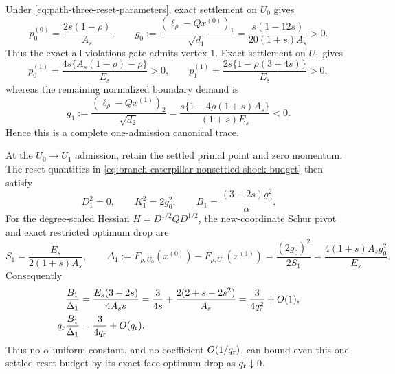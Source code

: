 \begin{proposition}
\label{prop:path-three-settled-reset-drop-obstruction}
Under \cref{eq:path-three-reset-parameters}, exact settlement on $U_0$ gives
\begin{equation}
 p_0^{(0)}=\frac{2s(1-\rho)}{A_s},
 \qquad
 g_0:=\frac{(\ell_\rho-Qx^{(0)})_1}{\sqrt{d_1}}
 =\frac{s(1-12s)}{20(1+s)A_s}>0.
 \label{eq:path-three-first-settlement-demand}
\end{equation}
Thus the exact all-violations gate admits vertex $1$.  Exact settlement on
$U_1$ gives
\begin{equation}
 p_0^{(1)}=\frac{4s\{A_s(1-\rho)-\rho\}}{E_s}>0,
 \qquad
 p_1^{(1)}=\frac{2s\{1-\rho(3+4s)\}}{E_s}>0,
 \label{eq:path-three-second-settlement}
\end{equation}
whereas the remaining normalized boundary demand is
\begin{equation}
 g_1:=\frac{(\ell_\rho-Qx^{(1)})_2}{\sqrt{d_2}}
 =\frac{s\{1-4\rho(1+s)A_s\}}{(1+s)E_s}<0.
 \label{eq:path-three-terminal-demand}
\end{equation}
Hence this is a complete one-admission canonical trace.

At the $U_0\to U_1$ admission, retain the settled primal point and zero
momentum.  The reset quantities in
\cref{eq:branch-caterpillar-nonsettled-shock-budget} then satisfy
\begin{equation}
 D_1^2=0,\qquad K_1^2=2g_0^2,\qquad
 B_1=\frac{(3-2s)g_0^2}{\alpha}.
 \label{eq:path-three-reset-budget}
\end{equation}
For the degree-scaled Hessian
$H=D^{1/2}QD^{1/2}$, the new-coordinate Schur pivot and exact restricted
optimum drop are
\begin{equation}
 S_1=\frac{E_s}{2(1+s)A_s},
 \qquad
 \Delta_1:=F_{\rho,U_0}(x^{(0)})-F_{\rho,U_1}(x^{(1)})
 =\frac{(2g_0)^2}{2S_1}
 =\frac{4(1+s)A_sg_0^2}{E_s}.
 \label{eq:path-three-schur-drop}
\end{equation}
Consequently
\begin{align}
 \frac{B_1}{\Delta_1}
 &=\frac{E_s(3-2s)}{4A_ss}
 =\frac{3}{4s}+\frac{2(2+s-2s^2)}{A_s}
 =\frac{3}{4q_{\rm r}^2}+O(1),
 \notag\\
 q_{\rm r}\frac{B_1}{\Delta_1}
 &=\frac{3}{4q_{\rm r}}+O(q_{\rm r}).
 \label{eq:path-three-reset-drop-ratio}
\end{align}
Thus no $\alpha$-uniform constant, and no coefficient
$O(1/q_{\rm r})$, can bound even this one settled reset budget by its exact
face-optimum drop as $q_{\rm r}\downarrow0$.


\end{proposition}
